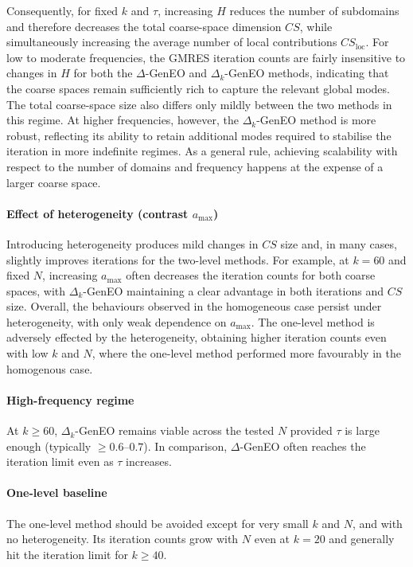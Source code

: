 \documentclass[preprint,3p,times]{elsarticle}
\theoremstyle{definition}
\numberwithin{equation}{section}
\begin{document}
{{Consequently, for fixed $k$ and $\tau$, increasing $H$ reduces the number of subdomains and therefore decreases 
the total coarse-space dimension $CS$, while simultaneously increasing the average number of local contributions $CS_{\mathrm{loc}}$. 
For low to moderate frequencies, the GMRES iteration counts are fairly insensitive to changes in $H$ 
for both the $\Delta$-GenEO and $\Delta_k$-GenEO methods, indicating that the coarse spaces remain sufficiently rich to capture the relevant global modes. 
The total coarse-space size also differs only mildly between the two methods in this regime. 
At higher frequencies, however, the $\Delta_k$-GenEO method is more robust, reflecting its ability to retain 
additional modes required to stabilise the iteration in more indefinite regimes. 
As a general rule, achieving scalability with respect to the number of domains and frequency happens at the expense of a larger coarse space.}


\paragraph{Effect of heterogeneity (contrast \texorpdfstring{$a_{\max}$}{a\_max})}
Introducing heterogeneity produces mild changes in $CS$ size and, in many cases, slightly improves iterations for the two-level methods. For example, at $k=60$ and fixed $N$, increasing $a_{\max}$ often decreases the iteration counts for both coarse spaces, with $\Delta_k$-GenEO maintaining a clear advantage in both iterations and $CS$ size.
Overall, the behaviours observed in the homogeneous case persist under heterogeneity, with only weak dependence on $a_{\max}$. 
The one-level method is adversely effected by the heterogeneity, obtaining higher iteration counts even with low $k$ and $N$, where the one-level method performed more favourably in the homogenous case. 

\paragraph{High-frequency regime}
At $k\ge 60$, $\Delta_k$-GenEO remains viable across the tested $N$ provided $\tau$ is large enough (typically $\ge 0.6$--$0.7$). In comparison, $\Delta$-GenEO often reaches the iteration limit even as $\tau$ increases.

\paragraph{One-level baseline}
The one-level method should be avoided except for very small $k$ and $N$, and with no heterogeneity. 
Its iteration counts grow with $N$ even at $k=20$ and generally hit the iteration limit for $k\ge 40$.


}
\end{document}
